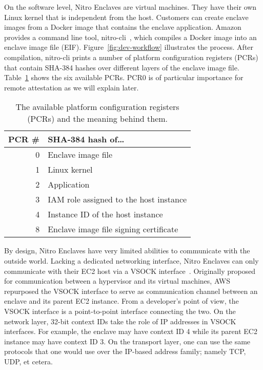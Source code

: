 On the software level, Nitro Enclaves are virtual machines.  They have their own
Linux kernel that is independent from the host.  Customers can create enclave
images from a Docker image that contains the enclave application.  Amazon
provides a command line tool, nitro-cli~\cite{nitro-cli}, which compiles a
Docker image into an enclave image file (EIF).  Figure~\ref{fig:dev-workflow}
illustrates the process.  After compilation, nitro-cli prints a number of
platform configuration registers (PCRs) that contain SHA-384 hashes over
different layers of the enclave image file.  Table~\ref{tab:pcr} shows the six
available PCRs.  PCR0 is of particular importance for remote attestation as we
will explain later.

\begin{table}[t]
    \centering
    \begin{tabular}{r l}
    \toprule
      PCR \# & SHA-384 hash of\ldots \\
    \midrule
      0 & Enclave image file \\
      1 & Linux kernel \\
      2 & Application \\
      3 & IAM role assigned to the host instance \\
      4 & Instance ID of the host instance \\
      8 & Enclave image file signing certificate \\
    \bottomrule
    \end{tabular}
    \caption{The available platform configuration registers (PCRs) and the
    meaning behind them.}%
    \label{tab:pcr}
\end{table}

By design, Nitro Enclaves have very limited abilities to communicate with the
outside world.  Lacking a dedicated networking interface, Nitro Enclaves can
only communicate with their EC2 host via a VSOCK interface~\cite{vsock}.
Originally proposed for communication between a hypervisor and its virtual
machines, AWS repurposed the VSOCK interface to serve as communication channel
between an enclave and its parent EC2 instance.  From a developer's point of
view, the VSOCK interface is a point-to-point interface connecting the two.  On
the network layer, 32-bit context IDs take the role of IP addresses in VSOCK
interfaces.  For example, the enclave may have context ID 4 while its parent EC2
instance may have context ID 3.  On the transport layer, one can use the same
protocols that one would use over the IP-based address family; namely TCP, UDP,
et cetera.
